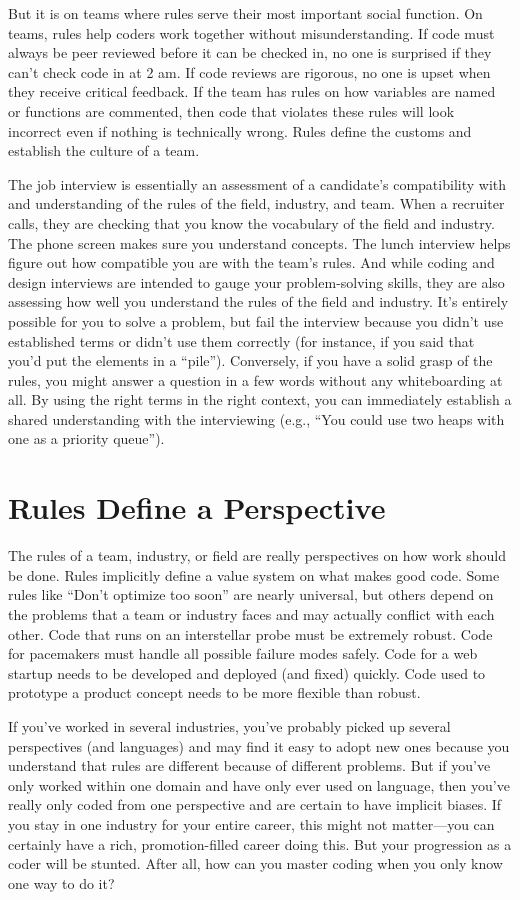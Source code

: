 But it is on teams where rules serve their most important social function. On
teams, rules help coders work together without misunderstanding. If code must
always be peer reviewed before it can be checked in, no one is surprised if
they can't check code in at 2 am. If code reviews are rigorous, no one is upset
when they receive critical feedback. If the team has rules on how variables are
named or functions are commented, then code that violates these rules will look
incorrect even if nothing is technically wrong. Rules define the customs and
establish the culture of a team.

The job interview is essentially an assessment of a candidate's compatibility
with and understanding of the rules of the field, industry, and team. When a
recruiter calls, they are checking that you know the vocabulary of the field
and industry. The phone screen makes sure you understand concepts. The lunch
interview helps figure out how compatible you are with the team's rules. And
while coding and design interviews are intended to gauge your problem-solving
skills, they are also assessing how well you understand the rules of the field
and industry. It's entirely possible for you to solve a problem, but
fail the interview because you didn't use established terms or didn't use them
correctly (for instance, if you said that you'd put the elements in a
``pile''). Conversely, if you have a solid grasp of the rules, you might answer
a question in a few words without any whiteboarding at all. By using the right
terms in the right context, you can immediately establish a shared
understanding with the interviewing (e.g., ``You could use
two heaps with one as a priority queue'').

\section{Rules Define a Perspective}

The rules of a team, industry, or field are really perspectives on how work
should be done. Rules implicitly define a value system on what makes good code.
Some rules like ``Don't optimize too soon'' are nearly universal, but others
depend on the problems that a team or industry faces and may actually conflict
with each other. Code that runs on an interstellar probe must be extremely
robust. Code for pacemakers must handle all possible failure modes safely. Code
for a web startup needs to be developed and deployed (and fixed) quickly. Code
used to prototype a product concept needs to be more flexible than robust.

If you've worked in several industries, you've probably picked up several
perspectives (and languages) and may find it easy to adopt new ones because
you understand that rules are different because of different problems. But if
you've only worked within one domain and have only ever used on language, then
you've really only coded from one perspective and are certain to have implicit
biases. If you stay in one industry for your entire career, this might not
matter---you can certainly have a rich, promotion-filled career doing this. But
your progression as a coder will be stunted. After all, how can you master
coding when you only know one way to do it?
